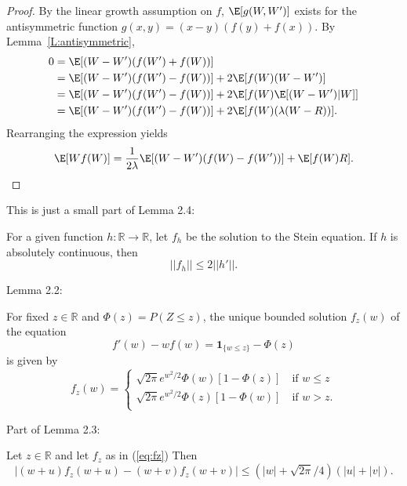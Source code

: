 \begin{proof}
  By the linear growth assumption on $f$, $\E [g(W, W')]$ exists for the antisymmetric function
  $g(x,y) = (x-y)(f(y)+f(x))$.  By Lemma~\ref{L:antisymmetric},
  \begin{equation*}
    \begin{split}
      0 &= \E [(W-W')(f(W')+f(W))] \\
      &= \E [(W-W')(f(W')-f(W))] + 2\E [f(W)(W-W')] \\
      &= \E [(W-W')(f(W')-f(W))] + 2\E [f(W)\E [(W-W')|W]] \\
      &= \E [(W-W')(f(W')-f(W))] + 2\E [f(W)(\lambda (W-R))].
    \end{split}
  \end{equation*}
  Rearranging the expression yields
  \begin{equation}
    \E [Wf(W)] = \frac{1}{2\lambda} \E [(W-W')(f(W)-f(W'))] + \E[f(W)R].
  \end{equation}
\end{proof}

This is just a small part of Lemma 2.4:
\begin{lemma}
  \label{L:stein-eq-sol-bound}
  For a given function $h: \mathbb{R} \to \mathbb{R}$, let $f_h$ be the solution to the Stein
  equation.  If $h$ is absolutely continuous, then
  \begin{equation}
    ||f_h|| \leq 2 ||h'||.    
  \end{equation}
\end{lemma}

Lemma 2.2:
\begin{lemma}
  \label{L:stein-eq-sol}
  For fixed $z \in \mathbb{R}$ and $\Phi(z) = P(Z \leq z)$, the unique bounded solution 
$f_z(w)$ of the equation
  \begin{equation}
    \label{eq:stein-eq}
    f'(w) - wf(w) = \mathbf{1}_{\{w \leq z\}} - \Phi(z)
  \end{equation}
  is given by 
  \begin{equation}
    \label{eq:fz}
    f_z(w) = 
    \begin{cases}
      \sqrt{2 \pi} e^{w^2/2} \Phi(w)[1-\Phi(z)] \quad \text{if } w \leq z \\
      \sqrt{2 \pi} e^{w^2/2} \Phi(z)[1-\Phi(w)] \quad \text{if } w > z. \\
    \end{cases}
  \end{equation}
\end{lemma}

Part of Lemma 2.3:
\begin{lemma}
  \label{L:stein-eq-sol-bound2}
  Let $z \in \mathbb{R}$ and let $f_z$ as in (\ref{eq:fz})
    Then 
    \begin{equation*}
      |(w + u)f_z(w + u) - (w + v)f_z(w + v)| \leq
      (|w| + \sqrt{2 \pi} / 4)(|u| + |v|).
    \end{equation*}
\end{lemma}

